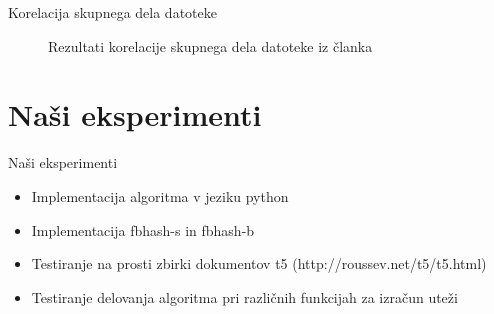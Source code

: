 \documentclass[xcolor=dvipsnames,compress]{beamer}
\begin{document}
\begin{frame}{Korelacija skupnega dela datoteke}
   \begin{figure}[ht!]
        \label{fig:subfigures}
        \begin{center}
        \end{center}
       \caption{Rezultati korelacije skupnega dela datoteke iz članka}
    \end{figure}
\end{frame}

\section{Naši eksperimenti}
\label{sec:eksmi}
\begin{frame}{Naši eksperimenti}
    \begin{itemize}
        \item Implementacija algoritma v jeziku python
        \item Implementacija fbhash-s in fbhash-b
        \item Testiranje na prosti zbirki dokumentov t5 (http://roussev.net/t5/t5.html)
        \item Testiranje delovanja algoritma pri različnih funkcijah za izračun uteži
    \end{itemize}
    \end{frame}
    
\end{document}
